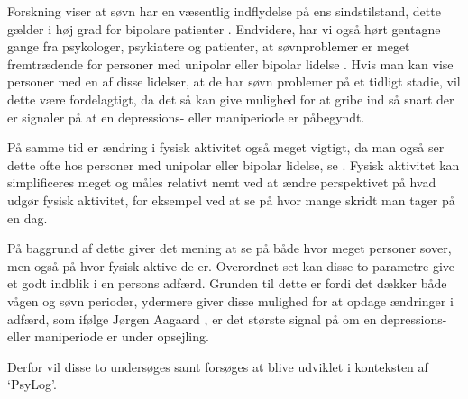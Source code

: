 Forskning viser at søvn har en væsentlig indflydelse på ens sindstilstand, dette gælder i høj grad for bipolare patienter \citep{CPSP:CPSP1164}.
Endvidere, har vi også hørt gentagne gange fra psykologer, psykiatere og patienter, at søvnproblemer er meget fremtrædende for personer med unipolar eller bipolar lidelse \citep[Kapitel 2, Sektion 3,4,5]{misc:faellesrapp}.
Hvis man kan vise personer med en af disse lidelser, at de har søvn problemer på et tidligt stadie, vil dette være fordelagtigt, da det så kan give mulighed for at gribe ind så snart der er signaler på at en depressions- eller maniperiode er påbegyndt.

På samme tid er ændring i fysisk aktivitet også meget vigtigt, da man også ser dette ofte hos personer med unipolar eller bipolar lidelse, se \citep[Kapitel 1, Sektion 4]{misc:faellesrapp}. 
Fysisk aktivitet kan simplificeres meget og måles relativt nemt ved at ændre perspektivet på hvad udgør fysisk aktivitet, for eksempel ved at se på hvor mange skridt man tager på en dag.

På baggrund af dette giver det mening at se på både hvor meget personer sover, men også på hvor fysisk aktive de er.
Overordnet set kan disse to parametre give et godt indblik i en persons adfærd.
Grunden til dette er fordi det dækker både vågen og søvn perioder, ydermere giver disse mulighed for at opdage ændringer i adfærd, som ifølge Jørgen Aagaard \citep[Kapitel 1, Sektion 4]{misc:faellesrapp}, er det største signal på om en depressions- eller maniperiode er under opsejling. 

Derfor vil disse to undersøges samt forsøges at blive udviklet i konteksten af `PsyLog'.